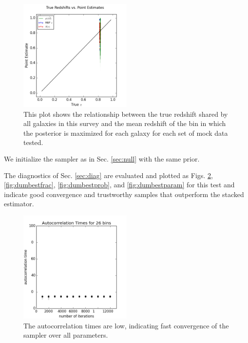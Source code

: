\documentclass[preprint]{aastex}
\begin{document}
\begin{figure}
\includegraphics[width=0.5\textwidth]{toy/truevmap.png}
\caption{This plot shows the relationship between the true redshift shared by all galaxies in this survey and the mean redshift of the bin in which the posterior is maximized for each galaxy for each set of mock data tested.}
\label{fig:toycat}
\end{figure}

We initialize the sampler as in Sec. \ref{sec:null} with the same prior.

%

The diagnostics of Sec. \ref{sec:diag} are evaluated and plotted as Figs. \ref{fig:dumbestacor}, \ref{fig:dumbestfrac}, \ref{fig:dumbestprob}, and \ref{fig:dumbestparam} for this test and indicate good convergence and trustworthy samples that outperform the stacked estimator.

\begin{figure}
\includegraphics[width=0.5\textwidth]{times-toy.png}
\caption{The autocorrelation times are low, indicating fast convergence of the sampler over all parameters.}
\label{fig:dumbestacor}
\end{figure}
\end{document}
